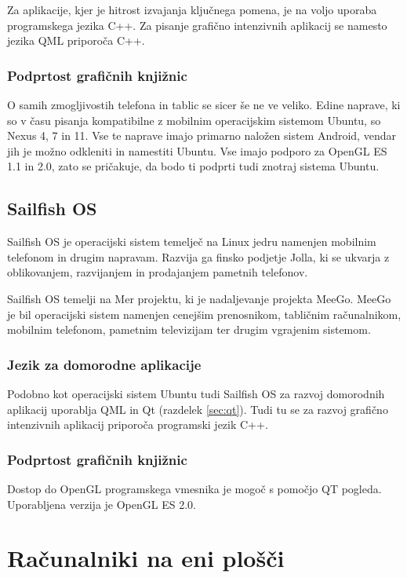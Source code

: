 Za aplikacije, kjer je hitrost izvajanja ključnega pomena, je na voljo uporaba programskega jezika C++. Za pisanje grafično intenzivnih aplikacij se namesto jezika QML priporoča C++.

\subsubsection{Podprtost grafičnih knjižnic}

O samih zmogljivostih telefona in tablic se sicer še ne ve veliko. Edine naprave, ki so v času pisanja kompatibilne z mobilnim operacijskim sistemom Ubuntu, so Nexus 4, 7 in 11. Vse te naprave imajo primarno naložen sistem Android, vendar jih je možno odkleniti in namestiti Ubuntu. Vse imajo podporo za OpenGL ES 1.1 in 2.0, zato se pričakuje, da bodo ti podprti tudi znotraj sistema Ubuntu.

\subsection{Sailfish OS}

Sailfish OS \cite{sailfishos} je operacijski sistem temelječ na Linux jedru namenjen mobilnim telefonom in drugim napravam. Razvija ga finsko podjetje Jolla, ki se ukvarja z oblikovanjem, razvijanjem in prodajanjem pametnih telefonov.

Sailfish OS temelji na Mer projektu, ki je nadaljevanje projekta MeeGo. MeeGo je bil operacijski sistem namenjen cenejšim prenosnikom, tabličnim računalnikom, mobilnim telefonom, pametnim televizijam ter drugim vgrajenim sistemom. 

\subsubsection{Jezik za domorodne aplikacije}

Podobno kot operacijski sistem Ubuntu tudi Sailfish OS za razvoj domorodnih aplikacij uporablja QML in Qt (razdelek \ref{sec:qt}). Tudi tu se za razvoj grafično intenzivnih aplikacij priporoča programski jezik C++.

\subsubsection{Podprtost grafičnih knjižnic}

Dostop do OpenGL programskega vmesnika je mogoč s pomočjo QT pogleda. Uporabljena verzija je OpenGL ES 2.0.

\section{Računalniki na eni plošči}

